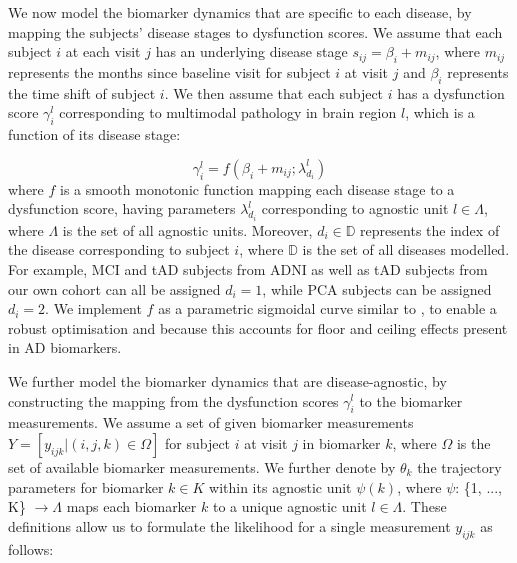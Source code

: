 \documentclass{llncs}
\begin{document}

We now model the biomarker dynamics that are specific to each disease, by mapping the subjects' disease stages to dysfunction scores. We assume that each subject $i$ at each visit $j$ has an underlying disease stage $s_{ij} = \beta_i + m_{ij}$, where $m_{ij}$ represents the months since baseline visit for subject $i$ at visit $j$ and $\beta_i$ represents the time shift of subject $i$. We then assume that each subject $i$ has a dysfunction score $\gamma_i^l$ corresponding to multimodal pathology in brain region $l$, which is a function of its disease stage:

\begin{equation}
\label{eqDysfunctionScoreDef}
 \gamma_i^l = f(\beta_i + m_{ij}; \lambda_{d_i}^l)
\end{equation}
where $f$ is a smooth monotonic function mapping each disease stage to a dysfunction score, having parameters $\lambda_{d_i}^l$ corresponding to agnostic unit $l \in \Lambda$, where $\Lambda$ is the set of all agnostic units. Moreover, $d_i \in \mathbb{D}$ represents the index of the disease corresponding to subject $i$, where $\mathbb{D}$ is the set of all diseases modelled. For example, MCI and tAD subjects from ADNI as well as tAD subjects from our own cohort can all be assigned $d_i=1$, while PCA subjects can be assigned $d_i=2$.  We implement $f$ as a parametric sigmoidal curve similar to \cite{jedynak2012computational}, to enable a robust optimisation and because this accounts for floor and ceiling effects present in AD biomarkers.


We further model the biomarker dynamics that are disease-agnostic, by constructing the mapping from the dysfunction scores $\gamma_i^l$ to the biomarker measurements. We assume a set of given biomarker measurements $Y = [y_{ijk} | (i,j,k) \in \Omega]$ for subject $i$ at visit $j$ in biomarker $k$, where $\Omega$ is the set of available biomarker measurements. We further denote by $\theta_k$ the trajectory parameters for biomarker $k \in K$ within its agnostic unit $\psi(k)$, where $\psi$: \{1, ..., K\} $ \rightarrow \Lambda$ maps each biomarker $k$ to a unique agnostic unit $l \in \Lambda$. These definitions allow us to formulate the likelihood for a single measurement $y_{ijk}$ as follows:
\end{document}
